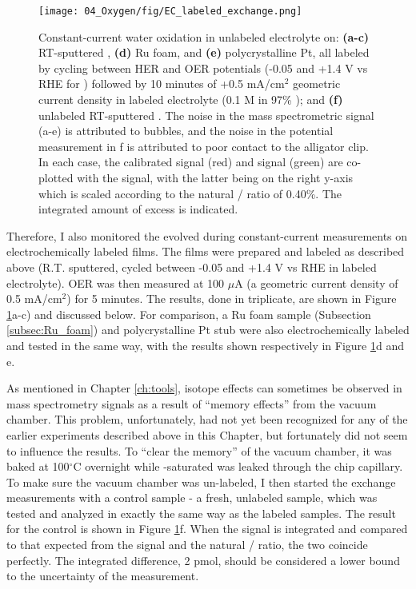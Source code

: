 \begin{figure}[h!]
	\centering
	\texttt{[image: 04\_Oxygen/fig/EC\_labeled\_exchange.png]}
	\caption{
		Constant-current water oxidation in unlabeled electrolyte on: \textbf{(a-c)} RT-sputtered , \textbf{(d)} Ru foam, and \textbf{(e)} polycrystalline Pt, all labeled by cycling between HER and OER potentials (-0.05 and +1.4 V vs RHE for ) followed by 10 minutes of +0.5 mA/cm$^2$ geometric current density in labeled electrolyte (0.1 M  in 97\% ); and \textbf{(f)} unlabeled RT-sputtered . The noise in the mass spectrometric signal (a-e) is attributed to bubbles, and the noise in the potential measurement in f is attributed to poor contact to the alligator clip. In each case, the calibrated  signal (red) and  signal (green) are co-plotted with the  signal, with the latter being on the right y-axis which is scaled according to the natural / ratio of 0.40\%. The integrated amount of excess  is indicated. 
	}
	\label{fig:EC_Ru}
\end{figure}

Therefore, I also monitored the  evolved during constant-current measurements on electrochemically labeled  films. The films were prepared and labeled as described above (R.T. sputtered, cycled between -0.05 and +1.4 V vs RHE in labeled electrolyte). OER was then measured at 100 $\mu$A (a geometric current density of 0.5 mA/cm$^2$) for 5 minutes. The results, done in triplicate, are shown in Figure \ref{fig:EC_Ru}a-c) and discussed below. For comparison, a Ru foam sample (Subsection \ref{subsec:Ru_foam}) and polycrystalline Pt stub were also electrochemically labeled and tested in the same way, with the results shown respectively in Figure \ref{fig:EC_Ru}d and e.

As mentioned in Chapter \ref{ch:tools}, isotope effects can sometimes be observed in mass spectrometry signals as a result of ``memory effects'' from the vacuum chamber. This problem, unfortunately, had not yet been recognized for any of the earlier experiments described above in this Chapter, but fortunately did not seem to influence the results. To ``clear the memory'' of the vacuum chamber, it was baked at 100$^\circ$C overnight while -saturated  was leaked through the chip capillary. To make sure the vacuum chamber was un-labeled, I then started the exchange measurements with a control sample - a fresh, unlabeled  sample, which was tested and analyzed in exactly the same way as the labeled samples. The result for the control is shown in Figure \ref{fig:EC_Ru}f. When the  signal is integrated and compared to that expected from the  signal and the natural / ratio, the two coincide perfectly. The integrated difference, 2 pmol, should be considered a lower bound to the uncertainty of the measurement.


